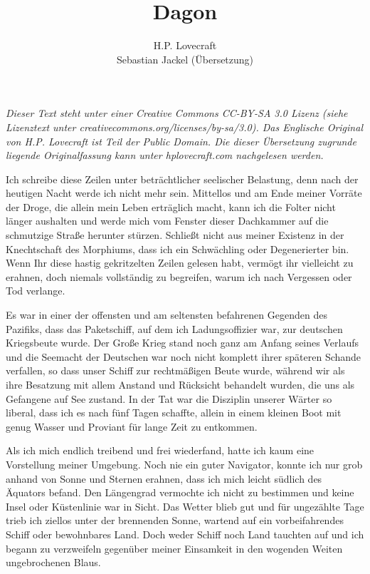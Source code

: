 \documentclass[a4paper]{memoir}
\begin{document}
\title{Dagon}
\author{H.P. Lovecraft\\
		Sebastian Jackel (Übersetzung)}
\date{}
\maketitle

\textit{Dieser Text steht unter einer Creative Commons CC-BY-SA 3.0 Lizenz
(siehe Lizenztext unter creativecommons.org/licenses/by-sa/3.0). Das Englische Original von H.P. Lovecraft ist Teil der Public Domain. Die dieser Übersetzung zugrunde liegende Originalfassung kann unter hplovecraft.com nachgelesen werden.}

\vspace{12pt}

Ich schreibe diese Zeilen unter beträchtlicher seelischer Belastung, denn nach der heutigen Nacht werde ich nicht mehr sein. Mittellos und am Ende meiner Vorräte der Droge, die allein mein Leben erträglich macht, kann ich die Folter nicht länger aushalten und werde mich vom Fenster dieser Dachkammer auf die schmutzige Straße herunter stürzen. Schließt nicht aus meiner Existenz in der Knechtschaft des Morphiums, dass ich ein Schwächling oder Degenerierter bin. Wenn Ihr diese hastig gekritzelten Zeilen gelesen habt, vermögt ihr vielleicht zu erahnen, doch niemals vollständig zu begreifen, warum ich nach Vergessen oder Tod verlange.

Es war in einer der offensten und am seltensten befahrenen Gegenden des Pazifiks, dass das Paketschiff, auf dem ich Ladungsoffizier war, zur deutschen Kriegsbeute wurde. Der Große Krieg stand noch ganz am Anfang seines Verlaufs und die Seemacht der Deutschen war noch nicht komplett ihrer späteren Schande verfallen, so dass unser Schiff zur rechtmäßigen Beute wurde, während wir als ihre Besatzung mit allem Anstand und Rücksicht behandelt wurden, die uns als Gefangene auf See zustand. In der Tat war die Disziplin unserer Wärter so liberal, dass ich es nach fünf Tagen schaffte, allein in einem kleinen Boot mit genug Wasser und Proviant für lange Zeit zu entkommen.

Als ich mich endlich treibend und frei wiederfand, hatte ich kaum eine Vorstellung meiner Umgebung. Noch nie ein guter Navigator, konnte ich nur grob anhand von Sonne und Sternen erahnen, dass ich mich leicht südlich des Äquators befand. Den Längengrad vermochte ich nicht zu bestimmen und keine Insel oder Küstenlinie war in Sicht. Das Wetter blieb gut und für ungezählte Tage trieb ich ziellos unter der brennenden Sonne, wartend auf ein vorbeifahrendes Schiff oder bewohnbares Land. Doch weder Schiff noch Land tauchten auf und ich begann zu verzweifeln gegenüber meiner Einsamkeit in den wogenden Weiten ungebrochenen Blaus.
\end{document}
